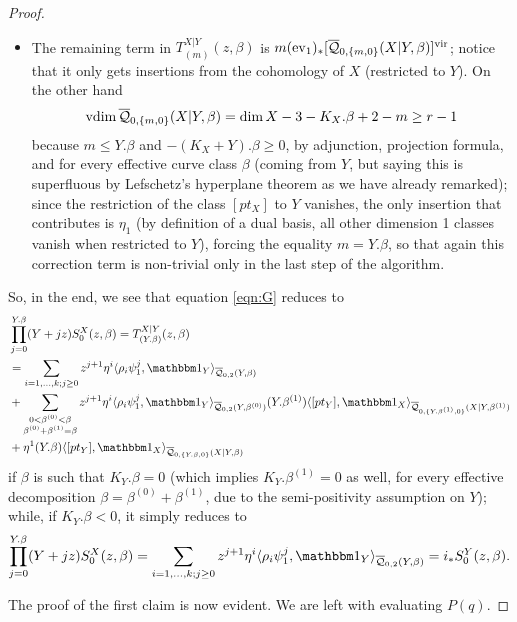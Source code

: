\begin{proof}
\begin{itemize}[leftmargin=*]
\item The remaining term in $T_{(m)}^{X|Y}(z,\beta)$ is $m(\operatorname{ev}_1)_*[\overline{\mathcal Q}_{0,\{m,0\}}(X|Y,\beta)]^\text{vir}$; notice that it only gets insertions from the cohomology of $X$ (restricted to $Y$). On the other hand
\[
 \operatorname{vdim} \overline{\mathcal Q}_{0,\{m,0\}}(X|Y,\beta)=\dim X-3 -K_X.\beta +2-m \geq r-1
\]
because $m\leq Y.\beta$ and $-(K_X+Y).\beta\geq 0$, by adjunction, projection formula, and for every effective curve class $\beta$ (coming from $Y$, but saying this is superfluous by Lefschetz's hyperplane theorem as we have already remarked); since the restriction of the class $[pt_X]$ to $Y$ vanishes, the only insertion that contributes is $\eta_1$ (by definition of a dual basis, all other dimension 1 classes vanish when restricted to $Y$), forcing the equality $m=Y.\beta$, so that again this correction term is non-trivial only in the last step of the algorithm.
\end{itemize}
So, in the end, we see that equation \ref{eqn:G} reduces to
\begin{align*}
 &\prod_{j=0}^{Y.\beta}(Y+jz) S_0^X(z,\beta) = T_{(Y.\beta)}^{X|Y}(z,\beta) \\
 &= \sum_{i=1,\ldots,k;j\geq 0}z^{j+1}\eta^i\langle \rho_i\psi_1^j,\mathbbm 1_{Y}\rangle_{\Q{0}{2}{Y}{\beta}} \\
 &+\sum_{\substack{0<\beta^{(0)}<\beta \\ \beta^{(0)}+\beta^{(1)}=\beta}}z^{j+1}\eta^i\langle \rho_i\psi_1^j,\mathbbm 1_{Y}\rangle_{\Q{0}{2}{Y}{\beta^{(0)}}}(Y.\beta^{(1)})\langle [pt_Y],\mathbbm 1_{X}\rangle_{\Q{0}{\{Y.\beta^{(1)},0\}}{X|Y}{\beta^{(1)}}}\\
 &+\eta^1(Y.\beta)\langle [pt_Y],\mathbbm 1_{X}\rangle_{\Q{0}{\{Y.\beta,0\}}{X|Y}{\beta}}
\end{align*}
if $\beta$ is such that $K_Y.\beta=0$ (which implies $K_Y.\beta^{(1)}=0$ as well, for every effective decomposition $\beta=\beta^{(0)}+\beta^{(1)}$, due to the semi-positivity assumption on $Y$); while, if $K_Y.\beta<0$, it simply reduces to
\[
 \prod_{j=0}^{Y.\beta}(Y+jz) S_0^X(z,\beta)= \sum_{i=1,\ldots,k;j\geq 0}z^{j+1}\eta^i\langle \rho_i\psi_1^j,\mathbbm 1_{Y}\rangle_{\Q{0}{2}{Y}{\beta}} = i_*S_0^Y(z,\beta).
\]


The proof of the first claim is now evident. We are left with evaluating $P(q)$.


\end{proof}
